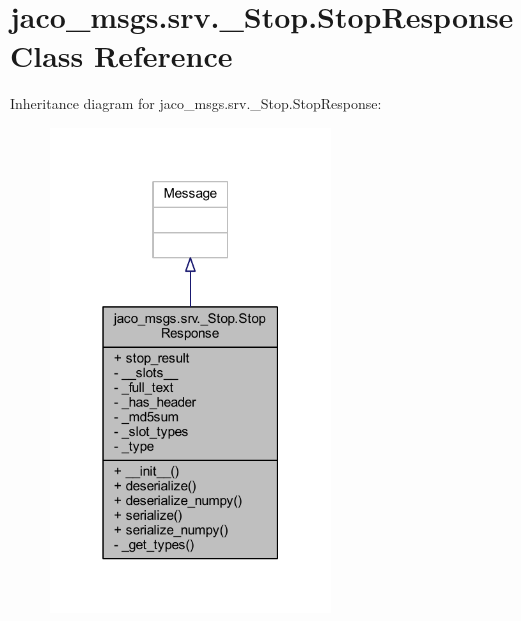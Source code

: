 \hypertarget{classjaco__msgs_1_1srv_1_1__Stop_1_1StopResponse}{}\section{jaco\+\_\+msgs.\+srv.\+\_\+\+Stop.\+Stop\+Response Class Reference}
\label{classjaco__msgs_1_1srv_1_1__Stop_1_1StopResponse}


Inheritance diagram for jaco\+\_\+msgs.\+srv.\+\_\+\+Stop.\+Stop\+Response\+:
\nopagebreak
\begin{figure}[H]
\begin{center}
\leavevmode
\includegraphics[width=211pt]{de/db0/classjaco__msgs_1_1srv_1_1__Stop_1_1StopResponse__inherit__graph}
\end{center}
\end{figure}


